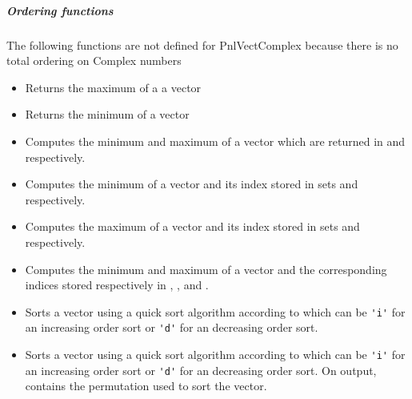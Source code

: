 \subparagraph{Ordering functions}
The following functions are not defined for PnlVectComplex because there is
no total ordering on Complex numbers

\begin{itemize}
\item {}
  \sshortdescribe Returns the maximum of a a vector  

\item {}
  \sshortdescribe Returns the minimum of a vector  

\item {}
  \sshortdescribe Computes the minimum and maximum of a vector which are
  returned in   and  respectively.
  
\item {}
  \sshortdescribe Computes the minimum of a vector and its index stored in 
  sets  and  respectively.

\item {}
  \sshortdescribe Computes the maximum of a vector and its index stored in 
  sets  and  respectively.

\item {}
  \sshortdescribe Computes the minimum and maximum of a vector and the
  corresponding indices stored respectively in , ,  and
  .

\item {}
  \sshortdescribe Sorts a vector using a quick sort algorithm according to
   which can be \verb!'i'! for an increasing order sort or
  \verb!'d'! for an decreasing order sort.

\item {}
  \sshortdescribe Sorts a vector using a quick sort algorithm according to
   which can be \verb!'i'! for an increasing order sort or
  \verb!'d'! for an decreasing order sort. On output,  contains the
  permutation used to sort the vector.
\end{itemize}

